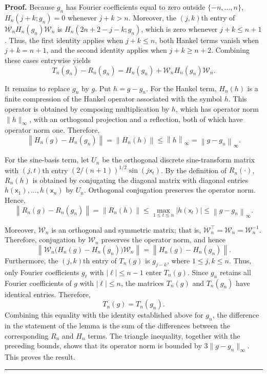 \documentclass[11pt]{article}
\newcommand{\sfx}{\mathsf{x}}
\newenvironment{proof}[1][Proof]{\noindent\textbf{#1.} }{\ \rule{0.5em}{0.5em}}
\numberwithin{equation}{section}
\numberwithin{figure}{section}
\begin{document}
\begin{proof}
Because \(g_n\) has Fourier coefficients equal to zero outside \(\{-n,\ldots,n\}\), \(H_n(j+k;g_n)=0\) whenever \(j+k>n\). Moreover, the \((j,k)\)th entry of \(\mathcal{W}_nH_n(g_n)\mathcal{W}_n\) is \(H_n(2n+2-j-k;g_n)\), which is zero whenever \(j+k\leq n+1\). Thus, the first identity applies when \(j+k\leq n\), both Hankel terms vanish when \(j+k=n+1\), and the second identity applies when \(j+k\geq n+2\). Combining these cases entrywise yields
\begin{equation*}
T_n(g_n)-R_n(g_n)
=
H_n(g_n)+\mathcal{W}_nH_n(g_n)\mathcal{W}_n.
\end{equation*}

It remains to replace \(g_n\) by \(g\). Put \(h=g-g_n\). For the Hankel term, \(H_n(h)\) is a finite compression of the Hankel operator associated with the symbol \(h\). This operator is obtained by composing multiplication by \(h\), which has operator norm \(\|h\|_\infty\), with an orthogonal projection and a reflection, both of which have operator norm one. Therefore,
\begin{equation*}
\left\|H_n(g)-H_n(g_n)\right\|
=
\left\|H_n(h)\right\|
\leq
\left\|h\right\|_\infty
=
\left\|g-g_n\right\|_\infty.
\end{equation*}

For the sine-basis term, let \(U_n\) be the orthogonal discrete sine-transform matrix with \((j,t)\)th entry \((2/(n+1))^{1/2}\sin(j\sfx_t)\). By the definition of \(R_n(\cdot)\), \(R_n(h)\) is obtained by conjugating the diagonal matrix with diagonal entries \(h(\sfx_1),\ldots,h(\sfx_n)\) by \(U_n\). Orthogonal conjugation preserves the operator norm. Hence,
\begin{equation*}
\left\|R_n(g)-R_n(g_n)\right\|
=
\left\|R_n(h)\right\|
\leq
\max_{1\leq t\leq n}|h(\sfx_t)|
\leq
\left\|g-g_n\right\|_\infty.
\end{equation*}

Moreover, \(\mathcal{W}_n\) is an orthogonal and symmetric matrix; that is, \(\mathcal{W}_n^\top=\mathcal{W}_n=\mathcal{W}_n^{-1}\). Therefore, conjugation by \(\mathcal{W}_n\) preserves the operator norm, and hence
\begin{equation*}
\left\|
\mathcal{W}_n
\bigl (H_n(g)-H_n(g_n)\bigr)
\mathcal{W}_n
\right\|
=
\left\|
H_n(g)-H_n(g_n)
\right\|.
\end{equation*}
Furthermore, the \((j,k)\)th entry of \(T_n(g)\) is \(g_{j-k}\), where \(1\leq j,k\leq n\). Thus, only Fourier coefficients \(g_\ell\) with \(|\ell|\leq n-1\) enter \(T_n(g)\). Since \(g_n\) retains all Fourier coefficients of \(g\) with \(|\ell|\leq n\), the matrices \(T_n(g)\) and \(T_n(g_n)\) have identical entries. Therefore,
\begin{equation*}
T_n(g)=T_n(g_n).
\end{equation*}
Combining this equality with the identity established above for \(g_n\), the difference in the statement of the lemma is the sum of the differences between the corresponding \(R_n\) and \(H_n\) terms. The triangle inequality, together with the preceding bounds, shows that its operator norm is bounded by \(3\|g-g_n\|_\infty\). This proves the result.
\end{proof}
\end{document}
